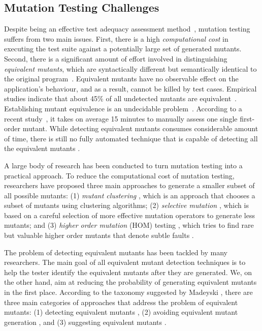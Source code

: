 \subsection{Mutation Testing Challenges}
Despite being an effective test adequacy assessment method~\cite{andrews:icse05,jia:tse10}, mutation testing suffers from two main issues.  First, there is a high \emph{computational cost} in executing the test suite against a potentially large set of generated mutants. Second, there is a significant amount of effort  involved in distinguishing \emph{equivalent mutants}, which are syntactically different but semantically identical to the original program~\cite{budd:acta82}.  Equivalent mutants have no observable effect on the application's behaviour, and as a result, cannot be killed by test cases. Empirical studies indicate that about 45\% of all undetected mutants are equivalent~\cite{schuler:tvr12, madeyski:tse13}.   
Establishing mutant equivalence is an undecidable problem~\cite{budd:acta82}. 
According to a recent study~\cite{madeyski:tse13}, it takes on average 15 minutes to manually assess one single first-order mutant. While detecting equivalent mutants consumes considerable amount of time, there is still no fully automated technique that is capable of detecting all the equivalent mutants \cite{madeyski:tse13}.

A large body of research has been conducted to turn mutation testing into a practical approach.
To reduce the computational cost of  mutation testing, researchers have
proposed three main approaches to generate a smaller subset of all possible mutants: 
(1) \emph{mutant clustering} \cite{ji:seke09}, which is an approach that chooses a subset of
mutants using clustering algorithms; (2)  \emph{selective mutation} \cite{barbosa:stvr01, siami:icse08, zhang:icse10}, which is based on a  
careful selection of more effective mutation operators to generate less mutants; and 
 (3) \emph{higher order mutation} (HOM) testing \cite{jia:scam08}, which tries to find 
rare but valuable higher order mutants that denote subtle faults \cite{jia:tse10}.   

The problem of detecting equivalent mutants has been tackled by many researchers. The main goal of all equivalent mutant detection techniques is to help the tester identify the equivalent mutants after they are generated. We, on the other hand, aim at reducing the probability of generating equivalent mutants in the first place.
According to the taxonomy suggested by Madeyski \etal \cite{madeyski:tse13}, there are three main categories of approaches that address the problem of equivalent mutants: (1) detecting equivalent mutants \cite{offutt:tvr97}, (2) avoiding equivalent mutant generation \cite{gligoric:issta13}, and (3) suggesting equivalent mutants \cite{schuler:tvr12}. 

